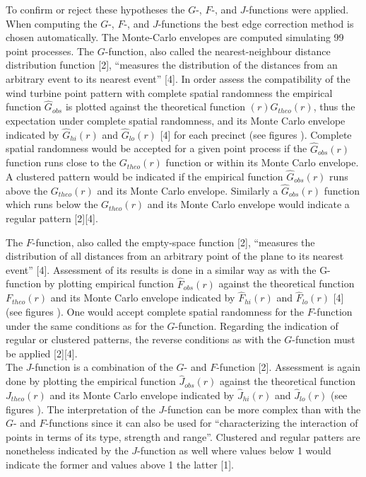 \documentclass[
]{article}
\begin{document}
To confirm or reject these hypotheses the \(G\)-, \(F\)-, and
\(J\)-functions were applied. When computing the \(G\)-, \(F\)-, and
\(J\)-functions the best edge correction method is chosen automatically.
The Monte-Carlo envelopes are computed simulating 99 point processes.
The \(G\)-function, also called the nearest-neighbour distance
distribution function {[}2{]}, ``measures the distribution of the
distances from an arbitrary event to its nearest event'' {[}4{]}. In
order assess the compatibility of the wind turbine point pattern with
complete spatial randomness the empirical function \(\hat{G}_{obs}\) is
plotted against the theoretical function \((r)G_{theo}(r)\), thus the
expectation under complete spatial randomness, and its Monte Carlo
envelope indicated by \(\hat{G}_{hi}(r)\) and \(\hat{G}_{lo}(r)\)
{[}4{]} for each precinct (see figures ). Complete spatial randomness
would be accepted for a given point process if the \(\hat{G}_{obs}(r)\)
function runs close to the \(G_{theo}(r)\) function or within its Monte
Carlo envelope. A clustered pattern would be indicated if the empirical
function \(\hat{G}_{obs}(r)\) runs above the \(G_{theo}(r)\) and its
Monte Carlo envelope. Similarly a \(\hat{G}_{obs}(r)\) function which
runs below the \(G_{theo}(r)\) and its Monte Carlo envelope would
indicate a regular pattern {[}2{]}{[}4{]}.

The \(F\)-function, also called the empty-space function {[}2{]},
``measures the distribution of all distances from an arbitrary point of
the plane to its nearest event'' {[}4{]}. Assessment of its results is
done in a similar way as with the G-function by plotting empirical
function \(\hat{F}_{obs}(r)\) against the theoretical function
\(F_{theo}(r)\) and its Monte Carlo envelope indicated by
\(\hat{F}_{hi}(r)\) and \(\hat{F}_{lo}(r)\) {[}4{]} (see figures ). One
would accept complete spatial randomness for the \(F\)-function under
the same conditions as for the \(G\)-function. Regarding the indication
of regular or clustered patterns, the reverse conditions as with the
\(G\)-function must be applied {[}2{]}{[}4{]}.\\

The \(J\)-function is a combination of the \(G\)- and \(F\)-function
{[}2{]}. Assessment is again done by plotting the empirical function
\(\hat{J}_{obs}(r)\) against the theoretical function \(J_{theo}(r)\)
and its Monte Carlo envelope indicated by \(\hat{J}_{hi}(r)\) and
\(\hat{J}_{lo}(r)\) (see figures ). The interpretation of the
\(J\)-function can be more complex than with the \(G\)- and
\(F\)-functions since it can also be used for ``characterizing the
interaction of points in terms of its type, strength and range''.
Clustered and regular patters are nonetheless indicated by the
\(J\)-function as well where values below 1 would indicate the former
and values above 1 the latter {[}1{]}.
\end{document}
